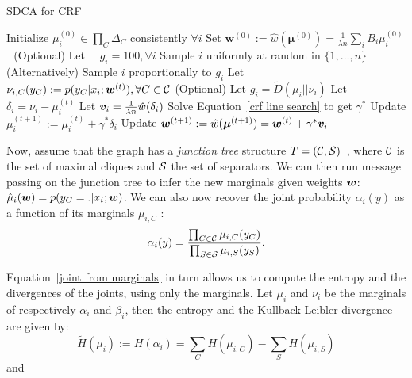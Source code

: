 \begin{algorithm}[t]
	\caption{SDCA for CRF}%
	\label{sdca for crf}
	\begin{algorithmic}
		\STATE Initialize $\mu_{i}^{(0)} \in \prod_C \Delta_{C}$ consistently $\forall i$ 
		\STATE Set $\bm{w}^{(0)}  :=  \hat{w}(\bm\mu^{(0)}) = \frac{1}{\lambda n} \sum_i B_i \mu_i^{(0)}$ \,\, 
		\STATE (Optional) Let $\quad g_i = 100, \forall i $
		\STATE Sample $i$ uniformly at random in $\{1,\ldots,n\}$
		\STATE (Alternatively)  Sample $i$ proportionally to $g_i$
		\STATE Let $\nu_{i, C} (y_C) := p(y_C | x_i; \boldsymbol{w}^{(t)}), \forall C\in{\mathcal C}$  
		\STATE (Optional) Let $g_i = \tilde D(\mu_i || \nu_i)$  
		\STATE Let $\delta_i = \nu_i - \mu_i^{(t)}$ 
		\STATE Let $\bm v_i = \frac{1}{\lambda n} \hat w(\delta_i)$ 
		\STATE Solve Equation~\eqref{crf line search} to get $\gamma^*$  
		\STATE Update $\mu_i^{(t+1)} := \mu_i^{(t)} + \gamma^* \delta_i$
		\STATE Update $\bm{w}^{(t+1)} := \hat{w}(\bm\mu^{(t+1)}) = \bm{w}^{(t)} + \gamma^* \bm v_i $
		\ENDFOR
	\end{algorithmic}
\end{algorithm}

Now, assume that the graph has a {\it junction tree} structure $T=({\mathcal C},{\mathcal S})$~\citep[Def.~10.3]{koller2009PGM}, where ${\mathcal C}$ is the set of maximal cliques and ${\mathcal S}$ the set of separators.
We can then run message passing on the junction tree to infer the new marginals given weights $\boldsymbol{w}$: $\hat \mu_i(\bm w) = {p(y_C=. | x_i ;\boldsymbol{w})}$.
We can also now recover the joint probability $\alpha_i(y)$ as a function of its marginals $\mu_{i, C}$ \citep[Def.~10.6]{koller2009PGM}:
\begin{equation}
	\label{joint from marginals}
	\alpha_i(y) = \frac{\prod_{C\in{\mathcal C}} \mu_{i, C} (y_C)}{\prod_{S \in{\mathcal S}} \mu_{i, S}(y_S)}.
\end{equation}


Equation~\eqref{joint from marginals} in turn allows us to compute the entropy and the divergences of the joints, using only the marginals. Let $\mu_i$ and $\nu_i$ be the marginals of respectively $\alpha_i$ and $\beta_i$, then the entropy and the Kullback-Leibler divergence are given by:
\begin{equation}
	\label{entropy marginal}
	\tilde H (\mu_i)
	:= H (\alpha_i)
	= \sum_C H(\mu_{i, C}) - \sum_S H(\mu_{i, S})
\end{equation}
and

